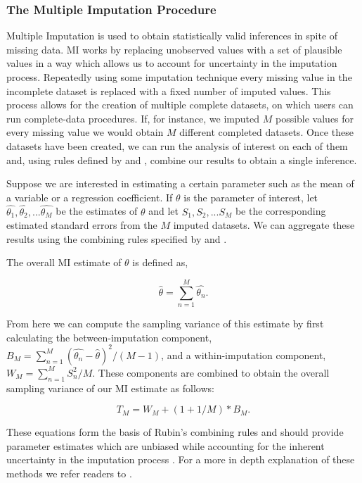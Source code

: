 \documentclass{svjour3}                     %
\begin{document}
\subsubsection{The Multiple Imputation Procedure}
\label{sec:1.3.2}
Multiple Imputation is used to obtain statistically valid inferences in spite of missing data. MI works by replacing unobserved values with a set of plausible values in a way which allows us to account for uncertainty in the imputation process. Repeatedly using some imputation technique every missing value in the incomplete dataset is replaced with a fixed number of imputed values. This process allows for the creation of multiple complete datasets, on which users can run complete-data procedures. If, for instance, we imputed $M$ possible values for every missing value we would obtain $M$ different completed datasets. Once these datasets have been created, we can run the analysis of interest on each of them and, using rules defined by \citet{little2014statistical} and \citet{rubin2004multiple}, combine our results to obtain a single inference. \par

Suppose we are interested in estimating a certain parameter such as the mean of a variable or a regression coefficient. If $\theta$ is the parameter of interest, let $\widehat{\theta_1}, \widehat{\theta_2}, ... \widehat{\theta_M}$ be the estimates of $\theta$ and let $S_1, S_2, ... S_M$ be the corresponding estimated standard errors from the $M$ imputed datasets. We can aggregate these results using the combining rules specified by \citet{little2014statistical} and \citet{rubin2004multiple}. \par
The overall MI estimate of $\theta$ is defined as,

\begin{equation}
\widehat{\theta} = \sum_{n=1}^{M} \widehat{\theta_n}.
\end{equation}

From here we can compute the sampling variance of this estimate by first calculating the between-imputation component, $B_M = \sum_{n=1}^{M} (\widehat{\theta_n} - \widehat{\theta})^2 / (M-1)$, and a within-imputation component, $W_M = \sum_{n=1}^{M} S_n^2 / M$. These components are combined to obtain the overall sampling variance of our MI estimate as follows:

\begin{equation}
T_M = W_M + (1+1/M)*B_M.
\end{equation}

These equations form the basis of Rubin's combining rules and should provide parameter estimates which are unbiased while accounting for the inherent uncertainty in the imputation process \citep{raghunathan2015missing}. For a more in depth explanation of these methods we refer readers to \citet{little2014statistical}. \par
\end{document}

